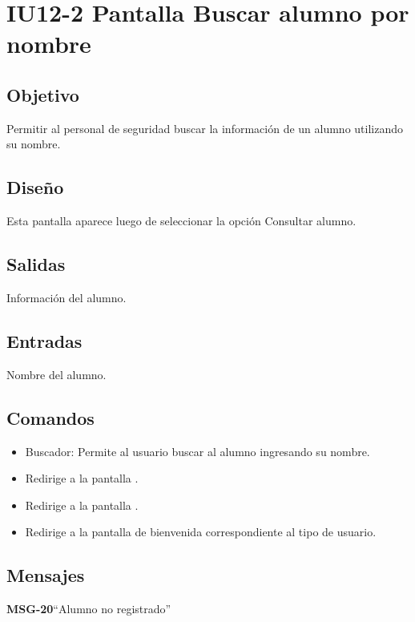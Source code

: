 \section{IU12-2 Pantalla Buscar alumno por nombre}

\subsection{Objetivo}
Permitir al personal de seguridad buscar la información de un alumno utilizando su nombre. 

\subsection{Diseño}
Esta pantalla  aparece luego de seleccionar la opción Consultar alumno. 


\subsection{Salidas}
Información del alumno.

\subsection{Entradas}
Nombre del alumno. 

\subsection{Comandos}

\begin{itemize}

	\item Buscador: Permite al usuario buscar al alumno ingresando su nombre. 
	\item {} Redirige a la pantalla .
    \item {} Redirige a la pantalla .
    \item {} Redirige a la pantalla de bienvenida correspondiente al tipo de usuario.
\end{itemize}

\subsection{Mensajes}

\begin{Citemize}
	\item {\bf MSG-20}{``Alumno no registrado''}
\end{Citemize}


